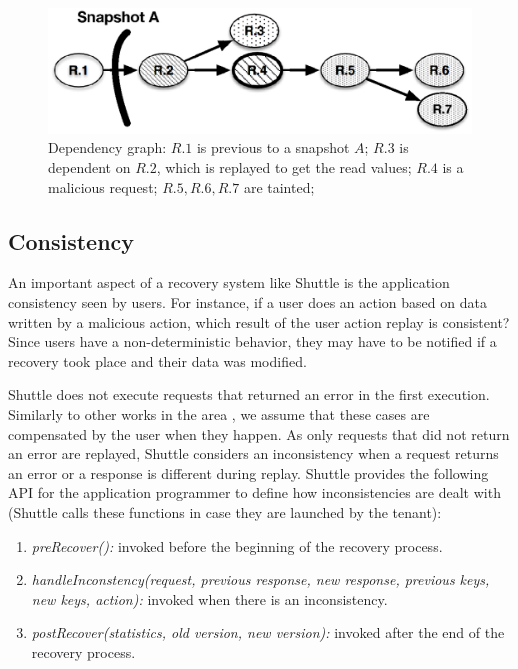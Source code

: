 \begin{figure}
  \centering
  \includegraphics[width=\linewidth]{images/selectiveDependency_paper}
  \caption{{Dependency graph:} $R.1$ is previous to a snapshot $A$; $R.3$ is dependent on $R.2$, which is replayed to get the read values; $R.4$ is a malicious request; $R.5,R.6,R.7$ are tainted;}
  \label{fig:selectiveGraph}
\end{figure}


\subsection{Consistency}
\label{sec:recovery:consistency}

An important aspect of a recovery system like Shuttle is the application consistency seen by users. For instance, if a user does an action based on data written by a malicious action, which result of the user action replay is consistent? Since users have a non-deterministic behavior, they may have to be notified if a recovery took place and their data was modified.

Shuttle does not execute requests that returned an error in the first execution. Similarly to other works in the area \cite{undoForOperators}, we assume that these cases are compensated by the user when they happen. As only requests that did not return an error are replayed, Shuttle considers an inconsistency when a request returns an error or a response is different during replay. Shuttle provides the following API for the application programmer to define how inconsistencies are dealt with (Shuttle calls these functions in case they are launched by the tenant):
\begin{enumerate}
  \item \textit{preRecover():} invoked before the beginning of the recovery process.
  \item \textit{handleInconstency(request, previous response, new response, previous keys, new keys, action):} invoked when there is an inconsistency.
  \item \textit{postRecover(statistics, old version, new version):} invoked after the end of the recovery process.
\end{enumerate}

